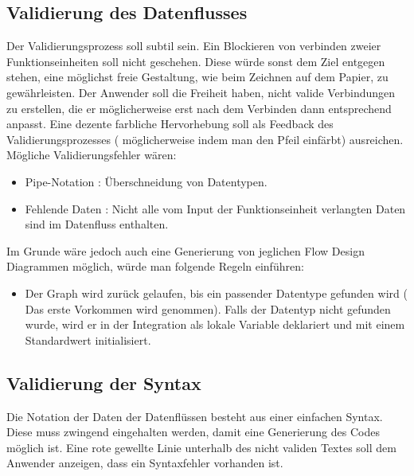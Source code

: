 \subsection{Validierung des Datenflusses}

Der Validierungsprozess soll subtil sein. Ein Blockieren von verbinden zweier
Funktionseinheiten soll nicht geschehen. Diese würde sonst dem Ziel entgegen stehen,
eine möglichst freie Gestaltung, wie beim Zeichnen auf dem Papier, zu
gewährleisten. Der Anwender soll die Freiheit haben, nicht valide Verbindungen
zu erstellen, die er möglicherweise erst nach dem Verbinden dann entsprechend
anpasst. Eine dezente farbliche Hervorhebung soll als Feedback des
Validierungsprozesses ( möglicherweise indem man den Pfeil einfärbt) ausreichen. Mögliche Validierungsfehler wären:
\begin{itemize}
\item Pipe-Notation : Überschneidung von Datentypen.
\item Fehlende Daten : Nicht alle vom Input der Funktionseinheit verlangten Daten
sind im Datenfluss enthalten.
\end{itemize}

Im Grunde wäre jedoch auch eine Generierung von jeglichen Flow Design Diagrammen
möglich, würde man folgende Regeln einführen:
\begin{itemize}
\item Der Graph wird zurück gelaufen, bis ein passender Datentype
gefunden wird ( Das erste Vorkommen wird genommen). Falls der Datentyp nicht
gefunden wurde, wird er in der Integration als lokale Variable deklariert und mit einem
Standardwert initialisiert.
\end{itemize}

\subsection{Validierung der Syntax}

Die Notation der Daten der Datenflüssen besteht aus einer einfachen Syntax. Diese muss zwingend eingehalten
 werden, damit eine Generierung des Codes möglich ist.
 Eine rote gewellte Linie unterhalb des nicht validen Textes soll dem Anwender
 anzeigen, dass ein Syntaxfehler vorhanden ist.

